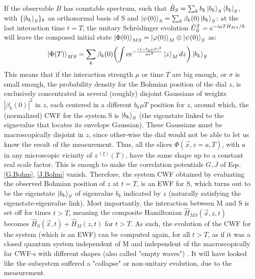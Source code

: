 \documentclass[11pt, a4paper]{article} %
\begin{document}
If the observable $B$ has countable spectrum, such that $\hat{B}_S=\sum_k b_k \ket{b_k}_S\bra{b_k}_S$, with $\{\ket{b_k}_S\}_k$ an orthonormal basis of S and $\ket{\psi(0)}_S=\sum_k \beta_k(0)\ket{b_k}_S$: at the last interaction time $t=T$, the unitary Schrödinger evolution $\hat{U} \null_{0}^T=e^{-i\mu T \hat{H}_{MS}/\hbar}$ will leave the composed initial state $\ket{\Phi(0)}_{MS}=\ket{\varphi(0)}_M\otimes\ket{\psi(0)}_S$ as:\vspace{-0.15cm}
\begin{equation}\label{postM1}
\ket{\Phi(T)}_{MS}=\sum_k \beta_k(0)\qty(\int c e^{-\frac{(z-b_k\mu T)^2}{4\sigma^2}}\ket{z}_M dz )\ket{b_k}_S
\end{equation}
This means that if the interaction strength $\mu$ or time $T$ are big enough, or $\sigma$ is small enough, the probability density for the Bohmian position of the dial $z$, is exclusively concentrated in several (roughly) disjoint Gaussians of weights $|\beta_k(0)|^2$ in $z$, each centered in a different $b_k \mu T$ position for $z$, around which, the (normalized) CWF for the system S is $\ket{b_k}_S$ (the eigenstate linked to the eignevalue that locates its envelope Gaussian). These Gaussians must be macroscopically disjoint in $z$, since other-wise the dial would not be able to let us know the result of the measurement. Thus, all the slices $\Phi(\vec{x},z=a,T)$, with $a$ in any microscopic vicinity of $z^{\: (\xi)}(T)$, have the same shape up to a constant real scale factor. This is enough to make the correlation potentials $G,J$ of Eqs. \eqref{G.Bohm}, \eqref{J.Bohm} vanish. Therefore, the system CWF obtained by evaluating the observed Bohmian position of $z$ at $t=T$, is an EWF for S, which turns out to be the eigenstate $\ket{b_k}_S$ of eigenvalue $b_k$ indicated by $z$ (naturally satisfying the eigenstate-eigenvalue link). Most importantly, the interaction between M and S is set off for times $t>T$, meaning the composite Hamiltonian $\hat{H}_{MS}(\vec{x},z,t)$ becomes $\hat{H}_S(\vec{x},t)+\hat{H}_M(z,t)$ for $t>T$. As such, the evolution of the CWF for the system (which is an EWF) can be computed again, for all $t>T$, as if it was a closed quantum system independent of M and independent of the macroscopically far CWF-s with different shapes (also called "empty waves") \cite{JordiXavier}. It will have looked like the subsystem suffered a "collapse" or non-unitary evolution, due to the measurement.

\end{document}
